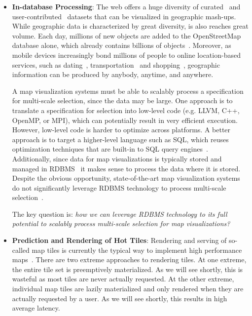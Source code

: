 \documentclass[11pt, oneside]{report}
\begin{document}
\begin{itemize}
\item \textbf{In-database Processing}: The web offers a huge diversity of curated~\cite{gst2014digitalmapsupply} and user-contributed~\cite{openstreetmap, zooniverse2014oldweather} datasets that can be visualized in geographic mash-ups. While geographic data is characterized by great diversity, is also reaches great volume. Each day, millions of new objects are added to the OpenStreetMap database alone, which already contains billions of objects~\cite{openstreetmap2014stats}. Moreover, as mobile devices increasingly bond millions of people to online location-based services, such as dating~\cite{tinder2014tinder}, transportation~\cite{drivr2014drivr} and shopping~\cite{}, geographic information can be produced by anybody, anytime, and anywhere.

A map visualization systems must be able to scalably process a specification for multi-scale selection, since the data may be large. One approach is to translate a specification for selection into low-level code (e.g. LLVM, C++, OpenMP, or MPI), which can potentially result in very efficient execution. However, low-level code is harder to optimize across platforms. A better approach is to target a higher-level language such as SQL, which reuses optimization techniques that are built-in to SQL query engines~\cite{boncz2005pathfinder, boncz2006monetdb, grust2009ferry}. Additionally, since data for map visualizations is typically stored and managed in RDBMS~\cite{wu2014case} it makes sense to process the data where it is stored. Despite the obvious opportunity, state-of-the-art map visualization systems do not significantly leverage RDBMS technology to process multi-scale selection~\cite{wu2014case}.

The key question is: \emph{how we can leverage RDBMS technology to its full potential to scalably process multi-scale selection for map visualizations?}

\item \textbf{Prediction and Rendering of Hot Tiles}: 
Rendering and serving of so-called map tiles is currently the typical way to implement high performance maps~\cite{}. There are two extreme approaches to rendering tiles. At one extreme, the entire tile set is preemptively materialized. As we will see shortly, this is wasteful as most tiles are never actually requested. At the other extreme, individual map tiles are lazily materialized and only rendered when they are actually requested by a user. As we will see shortly, this results in high average latency.


\end{itemize}
\end{document}
